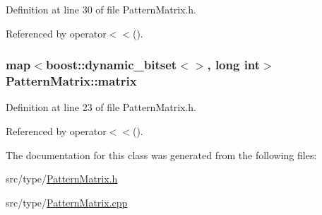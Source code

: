 Definition at line 30 of file Pattern\+Matrix.\+h.



Referenced by operator$<$$<$().

\hypertarget{classPatternMatrix_a76f1df5cd70ae108794659aaf5c79ffc}{}
\subsubsection[{matrix}]{\setlength{\rightskip}{0pt plus 5cm}map$<$boost\+::dynamic\+\_\+bitset$<$$>$, long int$>$ Pattern\+Matrix\+::matrix\hspace{0.3cm}{\ttfamily [private]}}\label{classPatternMatrix_a76f1df5cd70ae108794659aaf5c79ffc}


Definition at line 23 of file Pattern\+Matrix.\+h.



Referenced by operator$<$$<$().



The documentation for this class was generated from the following files\+:\begin{DoxyCompactItemize}
\item 
src/type/\hyperlink{PatternMatrix_8h}{Pattern\+Matrix.\+h}\item 
src/type/\hyperlink{PatternMatrix_8cpp}{Pattern\+Matrix.\+cpp}\end{DoxyCompactItemize}
